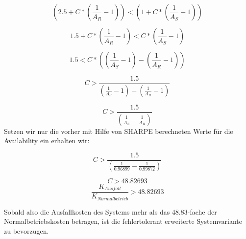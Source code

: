 \documentclass[10pt,a4paper]{article}
\begin{document}
\bigskip

\begin{equation*}
(2.5+C\ast (\frac{1}{A_{R}}-1))<(1+C\ast (\frac{1}{A_{S}}-1))
\end{equation*}

\bigskip

\begin{equation*}
1.5+C\ast (\frac{1}{A_{R}}-1)<C\ast (\frac{1}{A_{S}}-1)
\end{equation*}

\bigskip

\begin{equation*}
1.5<C\ast ((\frac{1}{A_{S}}-1)-(\frac{1}{A_{R}}-1))
\end{equation*}

\bigskip

\begin{equation*}
C>\frac{1.5}{(\frac{1}{A_{S}}-1)-(\frac{1}{A_{R}}-1)}
\end{equation*}

\bigskip

\begin{equation*}
C>\frac{1.5}{(\frac{1}{A_{S}}-\frac{1}{A_{R}})}
\end{equation*}
Setzen wir nur die vorher mit Hilfe von SHARPE berechneten Werte f\"ur die Availability ein erhalten wir:


\bigskip


\bigskip

\begin{equation*}
C>\frac{1.5}{(\frac{1}{0.96899}-\frac{1}{0.99872})}
\end{equation*}

\bigskip

\begin{equation*}
C>48.82693
\end{equation*}
\begin{equation*}
\frac{K_{\mathit{Ausfall}}}{K_{\mathit{Normalbetrieb}}}>48.82693
\end{equation*}

\bigskip

Sobald also die Ausfallkosten des Systems mehr als das 48.83-fache der
Normalbetriebskosten betragen, ist die fehlertolerant erweiterte
Systemvariante zu bevorzugen.


\bigskip
\end{document}
